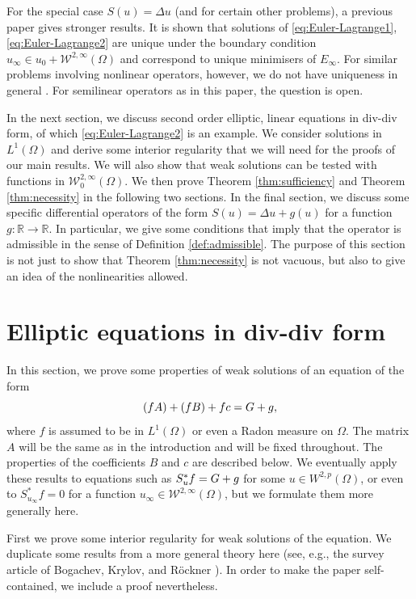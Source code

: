 \documentclass[a4paper]{article}
\newcommand{\R}{\mathbb{R}}
\newcommand{\W}{\mathcal{W}}
\let\div\relax\DeclareMathOperator{\div}{div}
\theoremstyle{remark}
\begin{document}
For the special case $S(u) = \Delta u$ (and for certain other problems),
a previous paper \cite{Katzourakis-Moser:19} gives stronger results.
It is shown that solutions of \eqref{eq:Euler-Lagrange1}, \eqref{eq:Euler-Lagrange2} are
unique under the boundary condition $u_\infty \in u_0 + \W^{2, \infty}(\Omega)$
and correspond to unique minimisers of $E_\infty$.
For similar problems involving nonlinear operators, however, we do not have uniqueness in general \cite{Moser:19}.
For semilinear operators as in this paper, the question is open.

In the next section, we discuss second order elliptic, linear equations
in div-div form, of which \eqref{eq:Euler-Lagrange2} is an example.
We consider solutions in $L^1(\Omega)$ and derive some interior regularity
that we will need for the proofs of our main results. We will also show that
weak solutions can be tested with functions in $\W_0^{2, \infty}(\Omega)$.
We then prove Theorem \ref{thm:sufficiency} and Theorem \ref{thm:necessity}
in the following two sections. In the final section, we discuss some specific
differential operators of the form $S(u) = \Delta u + g(u)$ for a function
$g \colon \R \to \R$. In particular, we give some conditions that imply
that the operator is admissible in the sense of Definition \ref{def:admissible}.
The purpose of this section is not just to show that Theorem
\ref{thm:necessity} is not vacuous, but also to give an idea of the
nonlinearities allowed.



\section{Elliptic equations in div-div form}

In this section, we prove some properties of weak
solutions of an equation of the form
\begin{equation} \label{eq:div-div}
\div \div (fA) + \div(fB) + fc = \div G + g,
\end{equation}
where $f$ is assumed to be in $L^1(\Omega)$ or even a Radon measure on $\Omega$.
The matrix $A$ will be the same as in the introduction and will be fixed throughout.
The properties of the coefficients $B$ and $c$ are described below.
We eventually apply these results to equations such as
$S_u^* f = \div G + g$ for some $u \in W^{2, p}(\Omega)$, or even to
$S_{u_\infty}^* f = 0$ for a function
$u_\infty \in \W^{2, \infty}(\Omega)$, but we formulate them more generally here.

First we prove some interior regularity for weak solutions
of the equation. We duplicate some results from a more general theory
here (see, e.g., the survey article of Bogachev, Krylov, and R\"ockner
\cite{Bogachev-Krylov-Rockner:09}). In order to make the paper self-contained,
we include a proof nevertheless.
\end{document}
